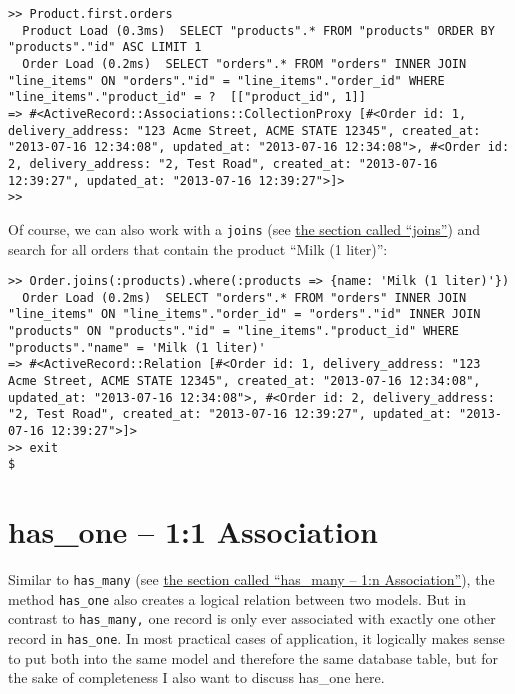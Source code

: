 \documentclass[a4paper]{book}
\newcounter{tab}[chapter]
\newcommand{\chap}[1]{\newpage\thispagestyle{empty}\chapter{#1}\label{chap:\thechapter}}
\begin{document}
\begin{shaded}\begin{verbatim}
>> Product.first.orders
  Product Load (0.3ms)  SELECT "products".* FROM "products" ORDER BY "products"."id" ASC LIMIT 1
  Order Load (0.2ms)  SELECT "orders".* FROM "orders" INNER JOIN "line_items" ON "orders"."id" = "line_items"."order_id" WHERE "line_items"."product_id" = ?  [["product_id", 1]]
=> #<ActiveRecord::Associations::CollectionProxy [#<Order id: 1, delivery_address: "123 Acme Street, ACME STATE 12345", created_at: "2013-07-16 12:34:08", updated_at: "2013-07-16 12:34:08">, #<Order id: 2, delivery_address: "2, Test Road", created_at: "2013-07-16 12:39:27", updated_at: "2013-07-16 12:39:27">]>
>>
\end{verbatim}\end{shaded}

Of course, we can also work with a \texttt{joins} (see \hyperref[activerecordux5f1nux5fjoins]{the section called “joins”}) and search for all orders that contain the product “Milk (1 liter)”:

\begin{shaded}\begin{verbatim}
>> Order.joins(:products).where(:products => {name: 'Milk (1 liter)'})
  Order Load (0.2ms)  SELECT "orders".* FROM "orders" INNER JOIN "line_items" ON "line_items"."order_id" = "orders"."id" INNER JOIN "products" ON "products"."id" = "line_items"."product_id" WHERE "products"."name" = 'Milk (1 liter)'
=> #<ActiveRecord::Relation [#<Order id: 1, delivery_address: "123 Acme Street, ACME STATE 12345", created_at: "2013-07-16 12:34:08", updated_at: "2013-07-16 12:34:08">, #<Order id: 2, delivery_address: "2, Test Road", created_at: "2013-07-16 12:39:27", updated_at: "2013-07-16 12:39:27">]>
>> exit
$
\end{verbatim}\end{shaded}

\chap{has\_one -- 1:1 Association}\label{hasux5fone-11-association}

Similar to \texttt{has\_many} (see \hyperref[activerecordux5fhasux5fmany]{the section called “has\_many -- 1:n Association”}), the method \texttt{has\_one} also creates a logical relation between two models. But in contrast to \texttt{has\_many,} one record is only ever associated with exactly one other record in \texttt{has\_one}. In most practical cases of application, it logically makes sense to put both into the same model and therefore the same database table, but for the sake of completeness I also want to discuss has\_one here.
\end{document}
